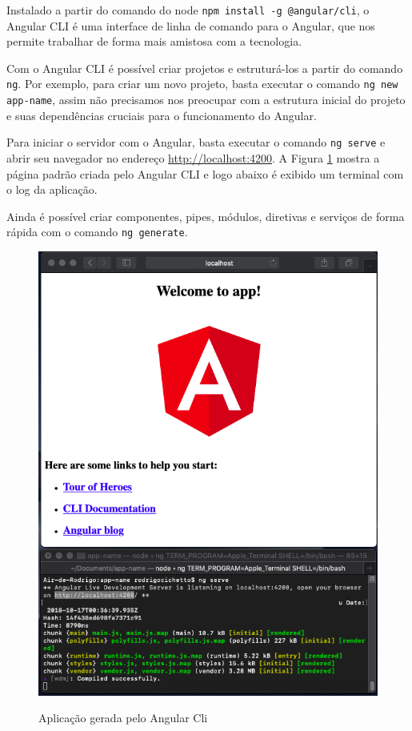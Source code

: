 \documentclass[
	12pt,				%
	openright,			%
	twoside,			%
	a4paper,			%
	english,			%
	brazil				%
	]{abntex2}
\begin{document}
\begin{anexosenv}
Instalado a partir do comando do node \verb|npm install -g @angular/cli|, o Angular CLI é uma interface de linha de comando para o Angular, que nos permite trabalhar de forma mais amistosa com a tecnologia.

Com o Angular CLI é possível criar projetos e estruturá-los a partir do comando \verb|ng|. Por exemplo, para criar um novo projeto, basta executar o comando \verb|ng new app-name|, assim não precisamos nos preocupar com a estrutura inicial do projeto e suas dependências cruciais para o funcionamento do Angular. 

Para iniciar o servidor com o Angular, basta executar o comando \verb|ng serve| e abrir seu navegador no endereço \href{http://localhost:4200}{http://localhost:4200}. A Figura \ref{fig:AngularCliApp} mostra a página padrão criada pelo Angular CLI e logo abaixo é exibido um terminal com o log da aplicação.

Ainda é possível criar componentes, pipes, módulos, diretivas e serviços de forma rápida com o comando \verb|ng generate|.

\begin{figure}[h]
	\centering

	\caption{Aplicação gerada pelo Angular Cli} \label{fig:AngularCliApp}
    \includegraphics[scale=0.4]{angular-cli-app} \\


\end{figure}
\end{anexosenv}
\end{document}
